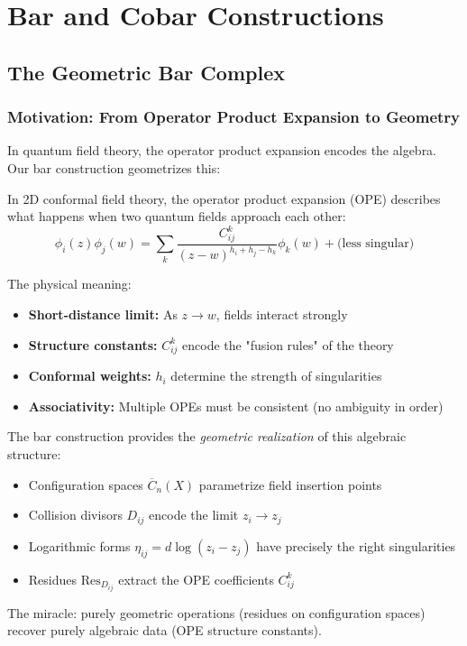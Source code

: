 \chapter{Bar and Cobar Constructions}
\section{The Geometric Bar Complex}

\subsection{Motivation: From Operator Product Expansion to Geometry}

In quantum field theory, the operator product expansion encodes the algebra. Our bar construction geometrizes this:

\begin{center}
\end{center}

\begin{remark}\label{rem:physical-genesis}
In 2D conformal field theory, the operator product expansion (OPE) describes what happens when two quantum fields approach each other:
$$\phi_i(z)\phi_j(w) = \sum_{k} \frac{C_{ij}^k}{(z-w)^{h_i+h_j-h_k}} \phi_k(w) + \text{(less singular)}$$

The physical meaning:
\begin{itemize}
\item \textbf{Short-distance limit:} As $z \to w$, fields interact strongly
\item \textbf{Structure constants:} $C_{ij}^k$ encode the "fusion rules" of the theory
\item \textbf{Conformal weights:} $h_i$ determine the strength of singularities
\item \textbf{Associativity:} Multiple OPEs must be consistent (no ambiguity in order)
\end{itemize}

The bar construction provides the \emph{geometric realization} of this algebraic structure:
\begin{itemize}
\item Configuration spaces $\overline{C}_n(X)$ parametrize field insertion points
\item Collision divisors $D_{ij}$ encode the limit $z_i \to z_j$
\item Logarithmic forms $\eta_{ij} = d\log(z_i - z_j)$ have precisely the right singularities
\item Residues $\text{Res}_{D_{ij}}$ extract the OPE coefficients $C_{ij}^k$
\end{itemize}

The miracle: purely geometric operations (residues on configuration spaces) recover purely algebraic data (OPE structure constants).
\end{remark}

